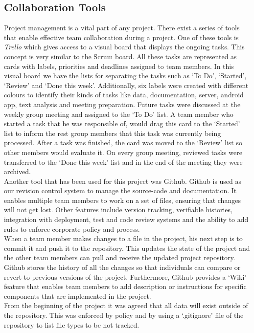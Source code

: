 \subsection{Collaboration Tools} 
Project management is a vital part of any project. There exist a series of tools that enable effective team 
collaboration during a project. One of these tools is \emph{Trello} which gives access to a visual board 
that displays the ongoing tasks. This concept is very similar to the Scrum board. All these tasks 
are represented as cards with labels, priorities and deadlines assigned to 
team members. In this visual board we have the lists for separating the tasks such as `To Do', `Started', `Review' and `Done this week'. 
Additionally, six labels were created with different colours to identify their kinds of tasks like data, 
documentation, server, android app, text analysis and meeting preparation. Future tasks were 
discussed at the weekly group meeting and assigned to the `To Do' list. A team member who started a task that he was responsible of, 
would drag this card to the `Started' list to inform the rest group members that this task was currently being processed. 
After a task was finished, the card was moved to the `Review' list so other members would evaluate it. 
On every group meeting, reviewed tasks were transferred to the `Done this week' list and in the end of the meeting they were
archived.\\ 
Another tool that has been used for this project was Github. Github is used as our revision control system to manage 
the source-code and documentation. It enables multiple team members to work on a set of files, 
ensuring that changes will not get lost. Other features include version tracking, verifiable histories, integration with deployment, 
test and code review systems and the ability to add rules to enforce corporate policy and process. \\
When a team member makes changes to a file in the project, his next step is to commit it and push it to the repository. 
This updates the state of the project and the other team members can pull and receive the updated project repository. 
Github stores the history of all the changes so that individuals can compare or revert 
to previous versions of the project. Furthermore, Github provides a `Wiki' feature that enables team members 
to add description or instructions for specific components that are implemented in the project.\\
From the beginning of the project it was agreed that all data will exist outside of the repository. This was enforced by 
policy and by using a `.gitignore' file of the repository to list file types to be not tracked.


